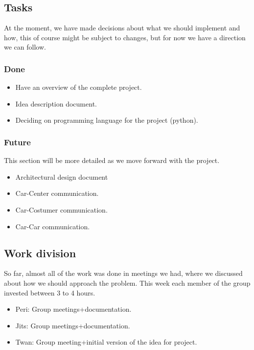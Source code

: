 \documentclass[a4paper]{article}
\begin{document}
\subsection*{Tasks}
At the moment, we have made decisions about what we should implement and how, this of course might be subject to changes, but for now we have a direction we can follow.

\subsubsection*{Done}
\begin{itemize}
    \item Have an overview of the complete project.
    \item Idea description document.
    \item Deciding on programming language for the project (python).
\end{itemize}

\subsubsection*{Future}
This section will be more detailed as we move forward with the project.
\begin{itemize}
    \item Architectural design document
    \item Car-Center communication.
    \item Car-Costumer communication.
    \item Car-Car communication.
\end{itemize}

\subsection*{Work division}
So far, almost all of the work was done in meetings we had, where we discussed about how we should approach the problem. This week each member of the group invested between 3 to 4 hours.
\begin{itemize}
    \item Peri: Group meetings+documentation.
    \item Jits: Group meetings+documentation.
    \item Twan: Group meeting+initial version of the idea for project.
\end{itemize}
\end{document}
